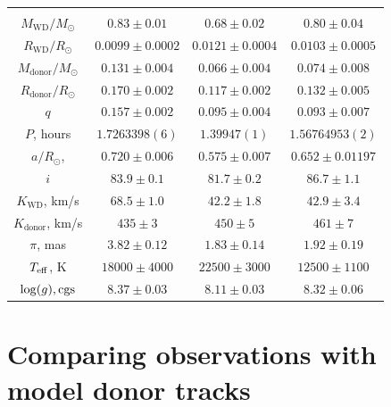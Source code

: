 \begin{table}
\begin{tabular}{cccc}
        \hline \hline \\
        $M_\mathrm{WD}/M_\odot$     & $0.83\pm0.01$     & $0.68\pm0.02$          & $0.80\pm0.04$           \\
        $R_\mathrm{WD}/R_\odot$     & $0.0099\pm0.0002$ & $0.0121\pm0.0004$      & $0.0103\pm0.0005$       \\
        $M_\mathrm{donor}/M_\odot$  & $0.131\pm0.004$   & $0.066\pm0.004$        & $0.074\pm0.008$         \\
        $R_\mathrm{donor}/R_\odot$  & $0.170\pm0.002$   & $0.117\pm0.002$        & $0.132\pm0.005$         \\
        $q$                         & $0.157\pm0.002$   & $0.095\pm0.004$        & $0.093\pm0.007$         \\
        \hline
        $P$, hours                  & $1.7263398(6)$    & $1.39947(1)$           & $1.56764953(2)$         \\
        $a/R_\odot$,                & $0.720\pm0.006$   & $0.575\pm0.007$        & $0.652\pm0.01197$       \\
        $i$                         & $83.9\pm0.1$      & $81.7\pm0.2$           & $86.7\pm1.1$            \\
        $K_\mathrm{WD}$, km/s       & $68.5\pm1.0$      & $42.2\pm1.8$           & $42.9\pm3.4$            \\
        $K_\mathrm{donor}$, km/s    & $435\pm3$         & $450\pm5$              & $461\pm7$               \\
        \hline
        $\pi$, mas                  & $3.82\pm0.12$     & $1.83\pm0.14$          & $1.92\pm0.19$           \\
        $T_{\rm eff}$, K            & $18000\pm4000$    & $22500\pm3000$         & $12500\pm1100$          \\
        $\log(g), {\rm cgs}$        & $8.37\pm0.03$     & $8.11\pm0.03$          & $8.32\pm0.06$           \\
        \hline
        \hline
    \end{tabular}
\end{table}



\section{Comparing observations with model donor tracks}
\label{sect:12 new cvs:eclipse modelling of 12 CVs}

